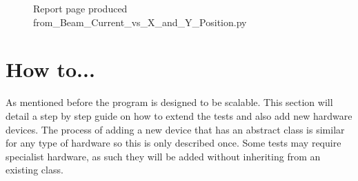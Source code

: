 \documentclass[a4paper, 11pt]{article}
\begin{document}
\begin{figure}[H]
\centering
{}
\caption{Report page produced from\_Beam\_Current\_vs\_X\_and\_Y\_Position.py}
\label{fig:ReportOut}
\end{figure}
\clearpage
 
\section{How to...}
As mentioned before the program is designed to be scalable. This section will detail a step by step guide on how to extend the tests and also add new hardware devices. The process of adding a new device that has an abstract class is similar for any type of hardware so this is only described once. Some tests may require specialist hardware, as such they will be added without inheriting from an existing class. 
\end{document}
